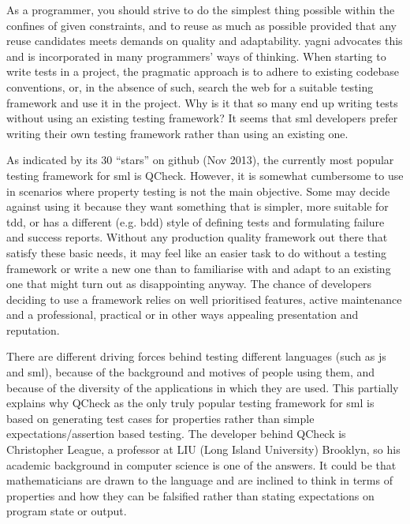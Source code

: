 \documentclass[11pt]{article}
\begin{document}
As a programmer, you should strive to do the simplest thing possible within the confines of given constraints, and to reuse as much as possible provided that any reuse candidates meets demands on quality and adaptability. \Gls{yagni} advocates this and is incorporated in many programmers' ways of thinking. When starting to write tests in a project, the pragmatic approach is to adhere to existing codebase conventions, or, in the absence of such, search the web for a suitable testing framework and use it in the project. Why is it that so many end up writing tests without using an existing testing framework? It seems that \gls{sml} developers prefer writing their own testing framework rather than using an existing one.

As indicated by its 30 ``stars'' on github (Nov 2013), the currently most popular testing framework for \gls{sml} is QCheck. However, it is somewhat cumbersome to use in scenarios where property testing is not the main objective. Some may decide against using it because they want something that is simpler, more suitable for \gls{tdd}, or has a different (e.g. \gls{bdd}) style of defining tests and formulating failure and success reports. Without any production quality framework out there that satisfy these basic needs, it may feel like an easier task to do without a testing framework or write a new one than to familiarise with and adapt to an existing one that might turn out as disappointing anyway. The chance of developers deciding to use a framework relies on well prioritised features, active maintenance and a professional, practical or in other ways appealing presentation and reputation.

There are different driving forces behind testing different languages (such as \gls{js} and \gls{sml}), because of the background and motives of people using them, and because of the diversity of the applications in which they are used. This partially explains why QCheck as the only truly popular testing framework for \gls{sml} is based on generating test cases for properties rather than simple expectations/assertion based testing. The developer behind QCheck is Christopher League, a professor at LIU (Long Island University) Brooklyn, so his academic background in computer science is one of the answers. It could be that mathematicians are drawn to the language and are inclined to think in terms of properties and how they can be falsified rather than stating expectations on program state or output.
\end{document}

